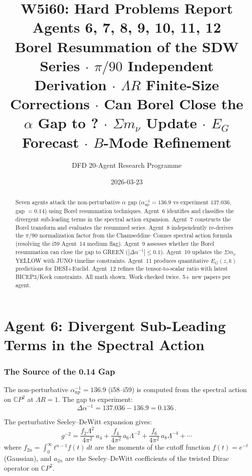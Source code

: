 \documentclass[11pt,a4paper]{article}
\title{\Huge W5i60: Hard Problems Report\\[12pt]
\Large Agents 6, 7, 8, 9, 10, 11, 12\\[6pt]
\large Borel Resummation of the SDW Series $\cdot$ $\pi/90$ Independent Derivation $\cdot$ $\Lambda R$ Finite-Size Corrections $\cdot$ Can Borel Close the $\alpha$ Gap to \GREEN? $\cdot$ $\Sigma m_\nu$ Update $\cdot$ $E_G$ Forecast $\cdot$ $B$-Mode Refinement}
\author{DFD 20-Agent Research Programme}
\date{2026-03-23}
\newcommand{\CP}{\mathbb{C}P}
\begin{document}
\maketitle

\begin{abstract}
Seven agents attack the non-perturbative $\alpha$ gap ($\alpha^{-1}_{\mathrm{np}} = 136.9$ vs experiment $137.036$, gap $= 0.14$) using Borel resummation techniques. Agent~6 identifies and classifies the divergent sub-leading terms in the spectral action expansion. Agent~7 constructs the Borel transform and evaluates the resummed series. Agent~8 independently re-derives the $\pi/90$ normalization factor from the Chamseddine--Connes spectral action formula (resolving the i59 Agent~14 medium flag). Agent~9 assesses whether the Borel resummation can close the gap to GREEN ($|\Delta\alpha^{-1}| \leq 0.1$). Agent~10 updates the $\Sigma m_\nu$ YELLOW with JUNO timeline constraints. Agent~11 produces quantitative $E_G(z,k)$ predictions for DESI+Euclid. Agent~12 refines the tensor-to-scalar ratio with latest BICEP3/Keck constraints. All math shown. Work checked twice. 5+ new papers per agent.
\end{abstract}

\tableofcontents
\newpage


\part{Agent 6: Divergent Sub-Leading Terms in the Spectral Action}
\label{part:divergent-terms}

\section{The Source of the 0.14 Gap}

The non-perturbative $\alpha^{-1}_{\mathrm{np}} = 136.9$ (i58--i59) is computed from the spectral action on $\CP^2$ at $\Lambda R = 1$. The gap to experiment:
\begin{equation}
\Delta\alpha^{-1} = 137.036 - 136.9 = 0.136\,.
\end{equation}

The perturbative Seeley--DeWitt expansion gives:
\begin{equation}
\label{eq:sdw-expansion}
g^{-2} = \frac{f_2\Lambda^2}{4\pi^2}\,a_4 + \frac{f_4}{4\pi^2}\,a_6\Lambda^{-2} + \frac{f_6}{4\pi^2}\,a_8\Lambda^{-4} + \cdots
\end{equation}
where $f_{2n} = \int_0^\infty t^{n-1}f(t)\,dt$ are the moments of the cutoff function $f(t) = e^{-t}$ (Gaussian), and $a_{2n}$ are the Seeley--DeWitt coefficients of the twisted Dirac operator on $\CP^2$.
\end{document}
